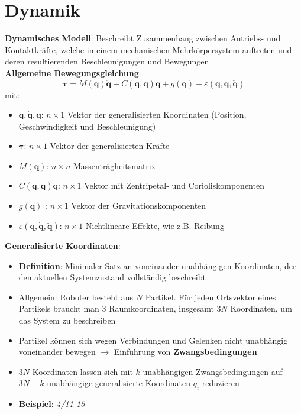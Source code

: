 \section{Dynamik}

\textbf{Dynamisches Modell}: Beschreibt Zusammenhang zwischen Antriebs- und Kontaktkräfte, welche in einem mechanischen Mehrkörpersystem auftreten und deren resultierenden Beschleunigungen und Bewegungen\\

\textbf{Allgemeine Bewegungsgleichung}:
$$\boldsymbol{\tau}=M(\mathbf{q})\mathbf{\ddot{q}}+C(\mathbf{q},\mathbf{\dot{q}})\mathbf{\dot{q}}+g(\mathbf{q})+\varepsilon(\mathbf{q},\mathbf{\dot{q}},\mathbf{\ddot{q}})$$
mit:
\begin{itemize}
	\item $\mathbf{q},\mathbf{\dot{q}},\mathbf{\ddot{q}}$: $n\times 1$ Vektor der generalisierten Koordinaten (Position, Geschwindigkeit und Beschleunigung)
	\item $\boldsymbol{\tau}$: $n\times 1$ Vektor der generalisierten Kräfte
	\item $M(\mathbf{q})$: $n\times n$ Massenträgheitsmatrix
	\item $C(\mathbf{q},\mathbf{\dot{q}})\mathbf{\dot{q}}$: $n\times 1$ Vektor mit Zentripetal- und Corioliskomponenten
	\item $g(\mathbf{q})$ : $n\times 1$ Vektor der Gravitationskomponenten
	\item $\varepsilon(\mathbf{q},\mathbf{\dot{q}},\mathbf{\ddot{q}})$: $n\times 1$ Nichtlineare Effekte, wie z.B. Reibung 
\end{itemize}
\bigskip
\textbf{Generalisierte Koordinaten}:
\begin{itemize}
	\item \textbf{Definition}: Minimaler Satz an voneinander unabhängigen Koordinaten, der den aktuellen Systemzustand vollständig beschreibt
	\item Allgemein: Roboter besteht aus $N$ Partikel. Für jeden Ortsvektor eines Partikels braucht man 3 Raumkoordinaten, insgesamt $3N$ Koordinaten, um das System zu beschreiben
	\item Partikel können sich wegen Verbindungen und Gelenken nicht unabhängig voneinander
	bewegen $\rightarrow$ Einführung von \textbf{Zwangsbedingungen}
	\item $3N$ Koordinaten lassen sich mit $k$ unabhängigen Zwangsbedingungen auf $3N-k$ unabhängige generalisierte Koordinaten $q_i$ reduzieren
	\item \textbf{Beispiel}: \textit{4/11-15}
\end{itemize}
